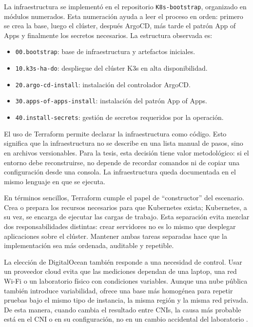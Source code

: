 La infraestructura se implementó en el repositorio \texttt{K8s-bootstrap}, organizado en módulos numerados. Esta numeración ayuda a leer el proceso en orden: primero se crea la base, luego el clúster, después ArgoCD, más tarde el patrón App of Apps y finalmente los secretos necesarios. La estructura observada es:

\begin{itemize}
\item \texttt{00.bootstrap}: base de infraestructura y artefactos iniciales.
\item \texttt{10.k3s-ha-do}: despliegue del clúster K3s en alta disponibilidad.
\item \texttt{20.argo-cd-install}: instalación del controlador ArgoCD.
\item \texttt{30.apps-of-apps-install}: instalación del patrón App of Apps.
\item \texttt{40.install-secrets}: gestión de secretos requeridos por la operación.
\end{itemize}

El uso de Terraform permite declarar la infraestructura como código. Esto significa que la infraestructura no se describe en una lista manual de pasos, sino en archivos versionables. Para la tesis, esta decisión tiene valor metodológico: si el entorno debe reconstruirse, no depende de recordar comandos ni de copiar una configuración desde una consola. La infraestructura queda documentada en el mismo lenguaje en que se ejecuta.

En términos sencillos, Terraform cumple el papel de ``constructor'' del escenario. Crea o prepara los recursos necesarios para que Kubernetes exista; Kubernetes, a su vez, se encarga de ejecutar las cargas de trabajo. Esta separación evita mezclar dos responsabilidades distintas: crear servidores no es lo mismo que desplegar aplicaciones sobre el clúster. Mantener ambas tareas separadas hace que la implementación sea más ordenada, auditable y repetible.

La elección de DigitalOcean también responde a una necesidad de control. Usar un proveedor cloud evita que las mediciones dependan de una laptop, una red Wi-Fi o un laboratorio físico con condiciones variables. Aunque una nube pública también introduce variabilidad, ofrece una base más homogénea para repetir pruebas bajo el mismo tipo de instancia, la misma región y la misma red privada. De esta manera, cuando cambia el resultado entre CNIs, la causa más probable está en el CNI o en su configuración, no en un cambio accidental del laboratorio \cite{ref29}.

